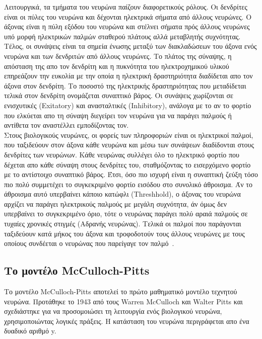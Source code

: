 \documentclass[12pt]{article}
\numberwithin{equation}{section}
\begin{document}
Λειτουργικά, τα τμήματα του νευρώνα παίζουν διαφορετικούς ρόλους. Οι δενδρίτες είναι οι πύλες του νευρώνα και δέχονται ηλεκτρικά σήματα από άλλους νευρώνες. Ο άξονας είναι η πύλη εξόδου του νευρώνα και στέλνει σήματα πρός άλλους νευρώνες υπό μορφή ηλεκτρικών παλμών σταθερού πλάτους αλλά μεταβλητής συχνότητας. Τέλος, οι συνάψεις είναι τα σημεία ένωσης μεταξύ των διακλαδώσεων του άξονα ενός νευρώνα και των δενδριτών από άλλους νευρώνες. Το πλάτος της σύναψης, η απόσταση της απο τον δενδρίτη και η πυκνότητα του ηλεκτροχημικού υλικού επηρεάζουν την ευκολία με την οποία η ηλεκτρική δραστηριότητα διαδίδεται απο τον άξονα στον δενδρίτη. Το ποσοστό της ηλεκτρικής δραστηριότητας που μεταδίδεται τελικά στον δενδρίτη ονομάζεται συναπτικό βάρος. Οι συνάψεις χωρίζονται σε ενισχυτικές (Exitatory) και ανασταλτικές (Inhibitory), ανάλογα με το αν το φορτίο που ελκύεται απο τη σύναψη διεγείρει τον νευρώνα για να παράγει παλμούς ή αντίθετα τον αναστέλλει εμποδίζοντας τον. \\

Στους βιολογικούς νευρώνες, οι φορείς των πληροφοριών είναι οι ηλεκτρικοί παλμοί, που ταξιδεύουν στον άξονα κάθε νευρώνα και μέσω των συνάψεων διαδίδονται στους δενδρίτες των νευρώνων. Κάθε νευρώνας συλλέγει όλο το ηλεκτρικό φορτίο που δέχεται απο κάθε σύναψη στους δενδρίτες του, σταθμόζοντας το εισερχόμενο φορτίο με το αντίστοιχο συναπτικό βάρος. Έτσι, όσο πιο ισχυρή είναι η συναπτική ζεύξη τόσο πιο πολύ συμμετέχει το συγκεκριμένο φορτίο εισόδου στο συνολικό άθροισμα. Άν το άθροισμα αυτό υπερβαίνει κάποιο κατώφλι (Threshhold), ο άξονας του νευρώνα αρχίζει να παράγει ηλεκτρικούς παλμούς με μεγάλη συχνότητα, άν όμως δεν υπερβαίνει το συγκεκριμένο όριο, τότε ο νευρώνας παράγει πολύ αραιά παλμούς σε τυχαίες χρονικές στιγμές (Αδρανής νευρώνας). Τελικά οι παλμοί που παράγονται ταξιδεύουν κατά μήκος του άξονα και τροφοδοτούν τους άλλους νευρώνες με τους οποίους συνδέεται ο νευρώνας που παρείγαγε τον παλμό~\cite{zhang2019basicneuralunitsbrain}.

\subsection{Το μοντέλο McCulloch-Pitts}

Το μοντέλο McCulloch-Pitts αποτελεί το πρώτο μαθηματικό μοντέλο τεχνητού νευρώνα. Προτάθηκε το 1943 από τους Warren McCulloch και Walter Pitts και σχεδιάστηκε για να προσομοιώσει τη λειτουργία ενός βιολογικού νευρώνα, χρησιμοποιώντας λογικές πράξεις. Η κατάσταση του νευρώνα περιγράφεται απο ένα δυαδικό αριθμό y.
\end{document}
